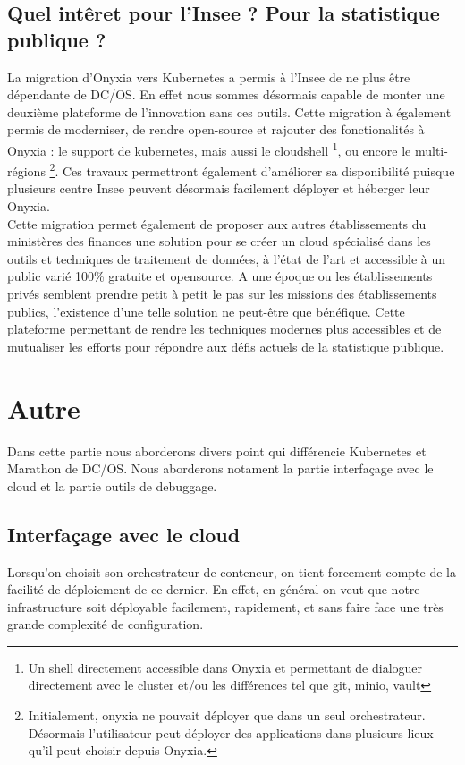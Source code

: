 \documentclass[11pt,fleqn]{book} %
\begin{document}
\section{Quel intêret pour l'Insee ? Pour la statistique publique ?}
La migration d'Onyxia vers Kubernetes a permis à l'Insee de ne plus être dépendante de DC/OS. En effet nous sommes désormais capable de monter une deuxième plateforme de l'innovation sans ces outils. Cette migration à également permis de moderniser, de rendre open-source et rajouter des fonctionalités à Onyxia : le support de kubernetes, mais aussi le cloudshell \footnote{Un shell directement accessible dans Onyxia et permettant de dialoguer directement avec le cluster et/ou les différences tel que git, minio, vault }, ou encore le multi-régions \footnote{Initialement, onyxia ne pouvait déployer que dans un seul orchestrateur. Désormais l'utilisateur peut déployer des applications dans plusieurs lieux qu'il peut choisir depuis Onyxia.}. Ces travaux permettront également d'améliorer sa disponibilité puisque plusieurs centre Insee peuvent désormais facilement déployer et héberger leur Onyxia.\\

Cette migration permet également de proposer aux autres établissements du ministères des finances une solution pour se créer un cloud spécialisé dans les outils et techniques de traitement de données, à l’état de l’art et accessible à un public varié 100\% gratuite et opensource. A une époque ou les établissements privés semblent prendre petit à petit le pas sur les missions des établissements publics, l'existence d'une telle solution ne peut-être que bénéfique. Cette plateforme permettant de rendre les techniques modernes plus accessibles et de mutualiser les efforts pour répondre aux défis actuels de la statistique publique.



\chapter{Autre}
\vspace{-2cm}
Dans cette partie nous aborderons divers point qui différencie Kubernetes et Marathon de DC/OS. Nous aborderons notament la partie interfaçage avec le cloud et la partie outils de debuggage.

\section{Interfaçage avec le cloud}
Lorsqu'on choisit son orchestrateur de conteneur, on tient forcement compte de la facilité de déploiement de ce dernier. En effet, en général on veut que notre infrastructure soit déployable facilement, rapidement, et sans faire face une très grande complexité de configuration.   
\end{document}
